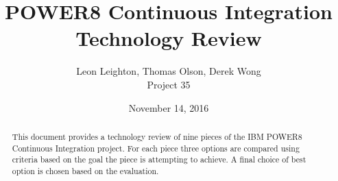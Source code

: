\documentclass[10pt,letterpaper,onecolumn,journal]{IEEEtran}
\begin{document}
\begin{titlepage}
  \title{POWER8 Continuous Integration\\ Technology Review}
  \author{Leon Leighton, Thomas Olson, Derek Wong\\Project 35}
  \date{November 14, 2016}
  \maketitle
  \vspace{4cm}
  \begin{abstract}
  \noindent This document provides a technology review of nine pieces of the IBM POWER8 Continuous Integration project.
    For each piece three options are compared using criteria based on the goal the piece is attempting to achieve.
    A final choice of best option is chosen based on the evaluation.
  \end{abstract}
\end{titlepage}

\tableofcontents
\clearpage
\end{document}
